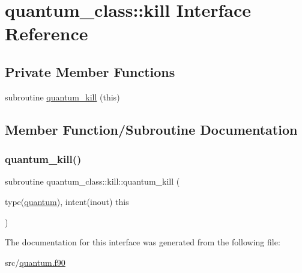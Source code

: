 \hypertarget{interfacequantum__class_1_1kill}{}\section{quantum\+\_\+class\+:\+:kill Interface Reference}
\label{interfacequantum__class_1_1kill}
\subsection*{Private Member Functions}
\begin{DoxyCompactItemize}
\item 
subroutine \hyperlink{interfacequantum__class_1_1kill_a54cb31ae4f56af89238b7a2602aab87d}{quantum\+\_\+kill} (this)
\end{DoxyCompactItemize}


\subsection{Member Function/\+Subroutine Documentation}
\mbox{\label{interfacequantum__class_1_1kill_a54cb31ae4f56af89238b7a2602aab87d}} 
\subsubsection{\texorpdfstring{quantum\+\_\+kill()}{quantum\_kill()}}
{\footnotesize\ttfamily subroutine quantum\+\_\+class\+::kill\+::quantum\+\_\+kill (\begin{DoxyParamCaption}\item[{type(\hyperlink{structquantum__class_1_1quantum}{quantum}), intent(inout)}]{this }\end{DoxyParamCaption})\hspace{0.3cm}{\ttfamily [private]}}



The documentation for this interface was generated from the following file\+:\begin{DoxyCompactItemize}
\item 
src/\hyperlink{quantum_8f90}{quantum.\+f90}\end{DoxyCompactItemize}
